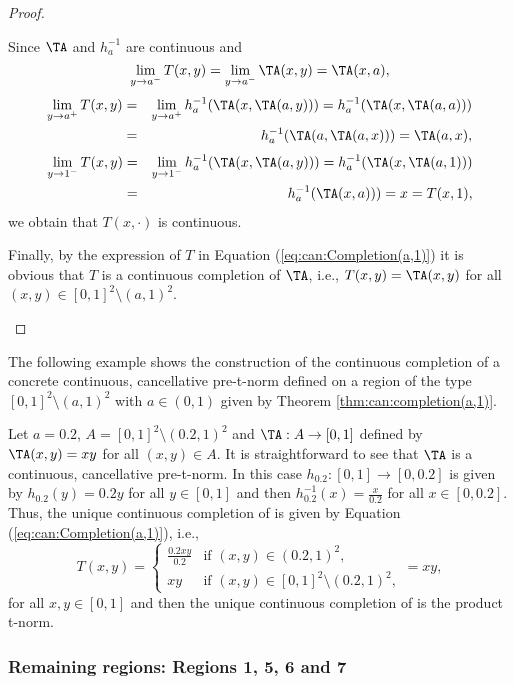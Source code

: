 \begin{proof}
\begin{description}
\begin{itemize}
$$			$$
			Since $\TA$ and $h_a^{-1}$ are continuous and
			$$\lim_{y \to a^-} T(x,y)=\lim_{y \to a^-} \TA(x,y)= \TA(x,a),$$
			\begin{eqnarray*}
			\lim_{y \to a^+}T(x,y) &=& \lim_{y \to a^+} h_a^{-1}(\TA(x,\TA(a,y)))=h_a^{-1}(\TA(x,\TA(a,a)))\\
			 &=& h_a^{-1}(\TA(a,\TA(a,x)))=\TA(a,x),
			\end{eqnarray*}
			\begin{eqnarray*}
			\lim_{y \to 1^-}T(x,y) &=& \lim_{y \to 1^-}h_a^{-1}(\TA(x,\TA(a,y))) = h_a^{-1}(\TA(x,\TA(a,1)))\\
			&=& h_a^{-1}(\TA(x,a)))=x=T(x,1),
			\end{eqnarray*}
			we obtain that $T(x,\cdot)$ is continuous.
		\end{itemize}
		Finally, by the expression of $T$ in Equation (\ref{eq:can:Completion(a,1)}) it is obvious that $T$ is a continuous completion of $\TA$, i.e., $T(x,y)=\TA(x,y)$ for all $(x,y) \in [0,1]^2 \setminus (a,1)^2$.
	\end{description}
\end{proof}

The following example shows the construction of the continuous completion of a concrete continuous, cancellative pre-t-norm defined on a region of the type $[0,1]^2 \setminus (a,1)^2$ with $a \in (0,1)$ given by Theorem \ref{thm:can:completion(a,1)}.

\begin{example}\label{example:can:(a,1)}
	Let $a=0.2$, $A=[0,1]^2 \setminus (0.2,1)^2$ and $\TA: A \to [0,1]$ defined by $\TA(x,y)=xy$ for all $(x,y) \in A$. It is straightforward to see that $\TA$ is a continuous, cancellative pre-t-norm. In this case $h_{0.2} : [0,1] \to [0,0.2]$ is given by $h_{0.2}(y)=0.2y$ for all $y \in [0,1]$ and then $h_{0.2}^{-1}(x)=\frac{x}{0.2}$ for all $x \in [0,0.2]$. Thus, the unique continuous completion of \TA is given by Equation (\ref{eq:can:Completion(a,1)}), i.e., 
	$$
		T(x,y)
		=
		\left\{ \begin{array}{ll}
			\frac{0.2xy}{0.2} & \text{if } (x,y) \in (0.2,1)^2,\\
			xy &   \text{if }   (x,y) \in [0,1]^2 \setminus (0.2,1)^2,
		\end{array} \right.
		=
		xy,
	$$
	for all $x,y \in [0,1]$ and then the unique continuous completion of \TA is the product t-norm.
\end{example}

\subsubsection{Remaining regions: Regions 1, 5, 6 and 7}

